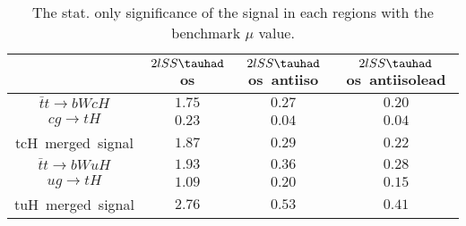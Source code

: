 \begin{table}
\caption{The stat. only significance of the signal in each regions with the benchmark $\mu$ value.}
\centering
\begin{tabular}{|c|c|c|c|} \hline
 & $2lSS\tauhad$ os & $2lSS\tauhad$ os~antiiso & $2lSS\tauhad$ os~antiisolead\\\hline
$\bar{t}t\to bWcH$ & $1.75$ & $0.27$ & $0.20$\\\hline
$cg\to tH$ & $0.23$ & $0.04$ & $0.04$\\\hline
tcH~merged~signal & $1.87$ & $0.29$ & $0.22$\\\hline
$\bar{t}t\to bWuH$ & $1.93$ & $0.36$ & $0.28$\\\hline
$ug\to tH$ & $1.09$ & $0.20$ & $0.15$\\\hline
tuH~merged~signal & $2.76$ & $0.53$ & $0.41$\\\hline
\end{tabular}
\label{tab:significance}
\end{table}
